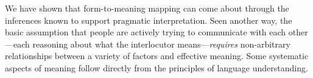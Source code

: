 \documentclass[10pt,letterpaper]{article}
\newcommand{\w}[1]{\emph{#1}}
\newcommand{\todo}[1]{{\color{red}#1}}
\begin{document}
{%

We have shown that form-to-meaning mapping can come about through the inferences known to support pragmatic interpretation.
Seen another way, the basic assumption that people are actively trying to communicate with each other---each reasoning about what the interlocutor means---\emph{requires} non-arbitrary relationships between a variety of factors and effective meaning.
Some systematic aspects of meaning follow directly from the principles of language understanding.


}
\end{document}
